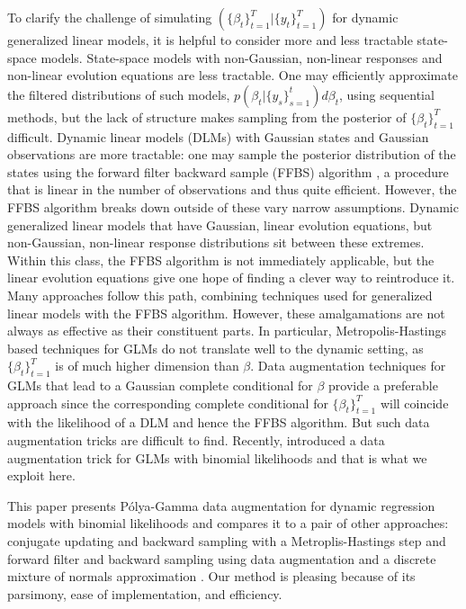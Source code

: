 \documentclass[12pt]{article}
\newcommand{\Polya}{P\'{o}lya}
\begin{document}
To clarify the challenge of simulating $(\{\beta_t\}_{t=1}^T | \{y_t\}_{t=1}^T)$
for dynamic generalized linear models, it is helpful to consider more and less
tractable state-space models.  State-space models with non-Gaussian, non-linear
responses and non-linear evolution equations are less tractable.  One may
efficiently approximate the filtered distributions of such models, $p(\beta_t |
\{y_s\}_{s=1}^t) d\beta_t$, using sequential methods, but the lack of structure
makes sampling from the posterior of $\{\beta_t\}_{t=1}^T$ difficult.  Dynamic
linear models (DLMs) with Gaussian states and Gaussian observations are more
tractable: one may sample the posterior distribution of the states using the
forward filter backward sample (FFBS) algorithm \citep{carter-kohn-1994,
  fruhwirth-schnatter-1994}, a procedure that is linear in the number of
observations and thus quite efficient.  However, the FFBS algorithm breaks down
outside of these vary narrow assumptions.  Dynamic generalized linear models
that have Gaussian, linear evolution equations, but non-Gaussian, non-linear
response distributions sit between these extremes.  Within this class, the FFBS
algorithm is not immediately applicable, but the linear evolution equations give
one hope of finding a clever way to reintroduce it.  Many approaches follow this
path, combining techniques used for generalized linear models with the FFBS
algorithm.  However, these amalgamations are not always as effective as their
constituent parts.  In particular, Metropolis-Hastings based techniques for GLMs
do not translate well to the dynamic setting, as $\{\beta_t\}_{t=1}^T$ is of
much higher dimension than $\beta$.  Data augmentation techniques for GLMs that
lead to a Gaussian complete conditional for $\beta$ provide a preferable
approach since the corresponding complete conditional for $\{\beta_t\}_{t=1}^T$
will coincide with the likelihood of a DLM and hence the FFBS algorithm.  But
such data augmentation tricks are difficult to find.  Recently,
\cite{polson-etal-2013} introduced a data augmentation trick for GLMs with
binomial likelihoods and that is what we exploit here.

This paper presents \Polya-Gamma data augmentation for dynamic regression models
with binomial likelihoods and compares it to a pair of other approaches:
conjugate updating and backward sampling with a Metroplis-Hastings step
\citep{ravines-etal-2006} and forward filter and backward sampling using data
augmentation and a discrete mixture of normals approximation
\citep{fruhwirth-schnatter-etal-2009, fussl-etal-2013}.  Our method is pleasing
because of its parsimony, ease of implementation, and efficiency.  
\end{document}
